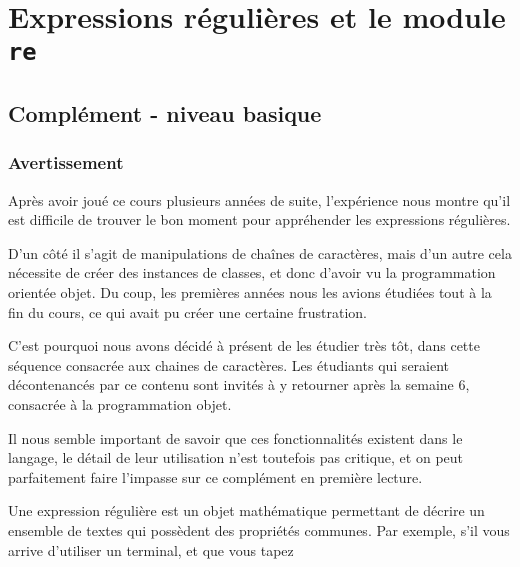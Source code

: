     
    
    
    

    

    \hypertarget{expressions-ruxe9guliuxe8res-et-le-module-re}{%
\section{\texorpdfstring{Expressions régulières et le module
\texttt{re}}{Expressions régulières et le module re}}\label{expressions-ruxe9guliuxe8res-et-le-module-re}}

    \hypertarget{compluxe9ment---niveau-basique}{%
\subsection{Complément - niveau
basique}\label{compluxe9ment---niveau-basique}}

    \hypertarget{avertissement}{%
\subsubsection{Avertissement}\label{avertissement}}

Après avoir joué ce cours plusieurs années de suite, l'expérience nous
montre qu'il est difficile de trouver le bon moment pour appréhender les
expressions régulières.

D'un côté il s'agit de manipulations de chaînes de caractères, mais d'un
autre cela nécessite de créer des instances de classes, et donc d'avoir
vu la programmation orientée objet. Du coup, les premières années nous
les avions étudiées tout à la fin du cours, ce qui avait pu créer une
certaine frustration.

C'est pourquoi nous avons décidé à présent de les étudier très tôt, dans
cette séquence consacrée aux chaines de caractères. Les étudiants qui
seraient décontenancés par ce contenu sont invités à y retourner après
la semaine 6, consacrée à la programmation objet.

Il nous semble important de savoir que ces fonctionnalités existent dans
le langage, le détail de leur utilisation n'est toutefois pas critique,
et on peut parfaitement faire l'impasse sur ce complément en première
lecture.

    Une expression régulière est un objet mathématique permettant de décrire
un ensemble de textes qui possèdent des propriétés communes. Par
exemple, s'il vous arrive d'utiliser un terminal, et que vous tapez

\begin{Shaded}
\begin{Highlighting}[frame=lines,framerule=0.6mm,rulecolor=\color{asisframecolor}]
\NormalTok{$ }
\end{Highlighting}
\end{Shaded}

